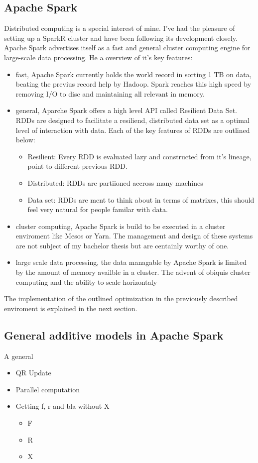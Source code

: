 \documentclass{article}
\begin{document}
    \subsection{Apache Spark}
    Distributed computing is a special interest of mine. I've had the pleasure of setting up a SparkR cluster and have been following its development closely. Apache Spark advertises itself as a fast and general cluster computing engine for large-scale data processing. He a overview of it's key features:
    \begin{itemize}
        \item fast, Apache Spark currently holds the world record in sorting 1 TB on data, beating the previus record help by Hadoop. Spark reaches this high speed by removing I/O to disc and maintaining all relevant in memory.
        \item general, Aparche Spark offers a high level API called Resilient Data Set. RDDs are designed to facilitate a resiliend, distributed data set as a optimal level of interaction with data. Each of the key features of RDDs are outlined below:
        \begin{itemize}
            \item Resilient: Every RDD is evaluated lazy and constructed from it's lineage, point to different previous RDD.
            \item Distributed: RDDs are partiioned accross many machines
            \item Data set: RDDs are ment to think about in terms of matrixes, this should feel very natural for people familar with data.
        \end{itemize}
        \item cluster computing, Apache Spark is build to be executed in a cluster enviroment like Mesos or Yarn. The management and design of these systems are not subject of my bachelor thesis but are centainly worthy of one.
        \item large scale data processing, the data managable by Apache Spark is limited by the amount of memory availble in a cluster. The advent of obiquis cluster computing and the ability to scale horizontaly
    \end{itemize} The implementation of the outlined optimization in the previously described enviroment is explained in the next section.

    \subsection{General additive models in Apache Spark}
    A general
    \begin{itemize}
        \item QR Update
        \item Parallel computation
        \item Getting f, r and bla without X
        \begin{itemize}
            \item F
            \item R
            \item X
        \end{itemize}
    \end{itemize}
\end{document}
